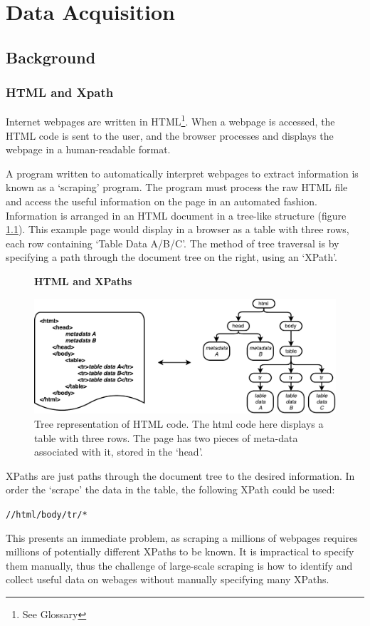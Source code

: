 \chapter{Data Acquisition}
\label{chapt:DATA_ACQUISITION}
\section{Background}
\subsection{HTML and Xpath}

Internet webpages are written in HTML\footnote{See Glossary}. When a webpage is accessed, the HTML code is sent to the user, and the browser processes and displays the webpage in a human-readable format. 

A program written to automatically interpret webpages to extract information is known as a `scraping' program. The program must process the raw HTML file and access the useful information on the page in an automated fashion. Information is arranged in an HTML document in a tree-like structure (figure \ref{fig:HTMLTREE}). This example page would display in a browser as a table with three rows, each row containing `Table Data A/B/C'. The method of tree traversal is by specifying a path through the document tree on the right, using an `XPath'. 
\begin{figure}[H]
    \centering
    \textbf{HTML and XPaths}\par\medskip
    \includegraphics[width=\textwidth]{Data_Acquisition/html_tree.pdf}
    \caption[Tree representation of HTML Code]{Tree representation of HTML code. The html code here displays a table with three rows. The page has two pieces of meta-data associated with it, stored in the `head'.}
        \label{fig:HTMLTREE}

\end{figure}
XPaths are just paths through the document tree to the desired information. In order the `scrape' the data in the table, the following XPath could be used:
\begin{center}
\texttt{//html/body/tr/*}
\end{center}
This presents an immediate problem, as scraping a millions of webpages requires millions of potentially different XPaths to be known. It is impractical to specify them manually, thus the challenge of large-scale scraping is how to identify and collect useful data on webages without manually specifying many XPaths.
